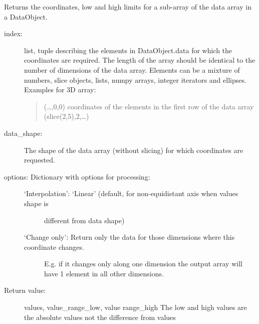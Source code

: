 \documentclass[letterpaper,10pt,english]{sphinxmanual}
\begin{document}
\begin{fulllineitems}
\begin{fulllineitems}
\label{\detokenize{coordinate:flap.coordinate.Coordinate.data}}
Returns the coordinates, low and high limits for a sub-array of the data array in a DataObject.
\begin{description}
\item[{index:}] \leavevmode
list, tuple describing the elements in DataObject.data for which the coordinates are
required. The length of the array should be identical to the number of dimensions
of the data array. Elements can be a mixture of numbers, slice objects, lists, numpy arrays,
integer iterators and ellipses.
Examples for 3D array:
\begin{quote}

(…,0,0) coordinates of the elements in the first row of the data array
(slice(2,5),2,…)
\end{quote}

\item[{data\_shape:}] \leavevmode
The shape of the data array (without slicing) for which coordinates are requested.

\item[{options: Dictionary with options for processing:}] \leavevmode\begin{description}
\item[{‘Interpolation’: ‘Linear’ (default, for non-equidistant axis when values shape is}] \leavevmode
different from data shape)

\item[{‘Change only’: Return only the data for those dimensions where this coordinate changes.}] \leavevmode
E.g. if it changes only along one dimension the output array will have 1 element
in all other dimensions.

\end{description}

\item[{Return value:}] \leavevmode
values, value\_range\_low, value range\_high
The low and high values are the absolute values not the difference from values

\end{description}

\end{fulllineitems}



\end{fulllineitems}
\end{document}
